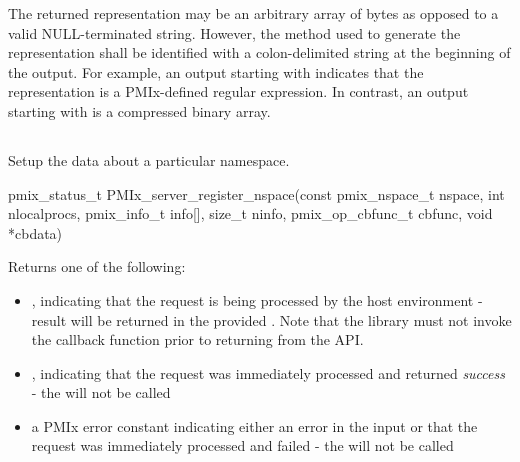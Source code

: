 \adviceuserstart
The returned representation may be an arbitrary array of bytes as opposed to a valid NULL-terminated string. However, the method used to generate the representation shall be identified with a colon-delimited string at the beginning of the output. For example, an output starting with  indicates that the representation is a \ac{PMIx}-defined regular expression. In contrast, an output starting with  is a compressed binary array.
\adviceuserend

\subsection{}

\summary

Setup the data about a particular namespace.

\format

\cspecificstart
\begin{codepar}
pmix_status_t
PMIx_server_register_nspace(const pmix_nspace_t nspace,
                        int nlocalprocs,
                        pmix_info_t info[], size_t ninfo,
                        pmix_op_cbfunc_t cbfunc, void *cbdata)
\end{codepar}
\cspecificend

\begin{arglist}
\end{arglist}

Returns one of the following:

\begin{itemize}
    \item {}, indicating that the request is being processed by the host environment - result will be returned in the provided . Note that the library must not invoke the callback function prior to returning from the \ac{API}.
    \item {}, indicating that the request was immediately processed and returned \textit{success} - the  will not be called
    \item a PMIx error constant indicating either an error in the input or that the request was immediately processed and failed - the  will not be called
\end{itemize}

